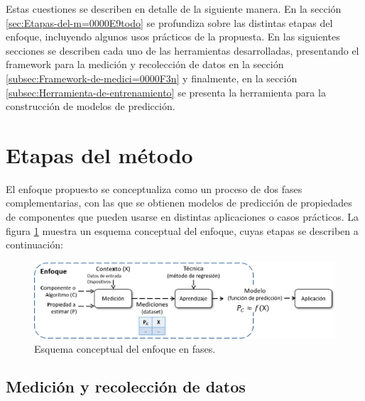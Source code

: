 Estas cuestiones se describen en detalle de la siguiente manera. En
la sección \ref{sec:Etapas-del-m=0000E9todo} se profundiza sobre
las distintas etapas del enfoque, incluyendo algunos usos prácticos
de la propuesta. En las siguientes secciones se describen cada uno
de las herramientas desarrolladas, presentando el framework para la
medición y recolección de datos en la sección \ref{subsec:Framework-de-medici=0000F3n}
y finalmente, en la sección \ref{subsec:Herramienta-de-entrenamiento}
se presenta la herramienta para la construcción de modelos de predicción. 


\section{Etapas del método\label{sec:Etapas-del-m=0000E9todo}}

El enfoque propuesto se conceptualiza como un proceso de dos fases
complementarias, con las que se obtienen modelos de predicción de
propiedades de componentes que pueden usarse en distintas aplicaciones
o casos prácticos. La figura \ref{fig:method-stages} muestra un esquema
conceptual del enfoque, cuyas etapas se describen a continuación:

\begin{figure}
\begin{centering}
\includegraphics[scale=0.55]{images/enfoque-overview}
\par\end{centering}

\caption{Esquema conceptual del enfoque en fases. \label{fig:method-stages}}
\end{figure}



\subsection*{Medición y recolección de datos }

